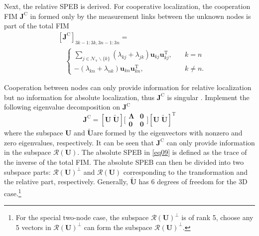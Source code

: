\documentclass{IEEEtran}
\begin{document}
Next, the relative SPEB is derived. For cooperative localization, the cooperation FIM $\mathbf{J}^{\text{C}}$ in \cite{SheWymWin:J10} formed only by the measurement links between the unknown nodes is part of the total FIM
\begin{equation}
\begin{aligned}
&[\mathbf{J}^{\text{C}}]_{3k-1:3k,3n-1:3n}=\\
&\quad \begin{cases}
\sum_{j\in\mathcal{N}_{\text{v}}\backslash \{k\}}(\lambda_{kj}+\lambda_{jk})\mathbf{u}_{kj}\mathbf{u}_{kj}^{\text{T}},\quad&k=n\\
-(\lambda_{kn}+\lambda_{nk})\mathbf{u}_{kn}\mathbf{u}_{kn}^{\text{T}},\quad&k\neq n.
\end{cases}
\end{aligned}
\end{equation}

Cooperation between nodes can only provide information for relative localization but no information for absolute localization, thus $\mathbf{J}^{\text{C}}$ is singular \cite{AshMos:J08}. Implement the following eigenvalue decomposition on $\mathbf{J}^{\text{C}}$
\begin{equation}
\mathbf{J}^{\text{C}}=[\mathbf{U} \; \widetilde{\mathbf{U}}]
\Bigg[\begin{array}{cc}
\boldsymbol{\Lambda}&\mathbf{0}\\
\mathbf{0}&\mathbf{0}
\end{array}\Bigg]
[\mathbf{U}\; \widetilde{\mathbf{U}}]^{\text{T}}
\end{equation}
where the subspace $\mathbf{U}$ and $\widetilde{\mathbf{U}}$are formed by the eigenvectors with nonzero and zero eigenvalues, respectively. It can be seen that $\mathbf{J}^{\text{C}}$ can only provide information in the subspace $\mathcal{R}(\mathbf{U})$. The absolute SPEB in \eqref{eq09} is defined as the trace of the inverse of the total FIM.  The absolute SPEB can then be divided into two subspace parts:  $\mathcal{R}(\mathbf{U})^\perp$ and $\mathcal{R}(\mathbf{U})$ corresponding to the transformation and the relative part, respectively.
Generally, $\widetilde{\mathbf{U}}$  has 6 degrees of freedom for the 3D case.\footnote{For the special two-node case, the subspace $\mathcal{R}(\mathbf{U})^\perp$ is of rank 5, choose any 5 vectors in $\mathcal{R}(\mathbf{U})^\perp$ can form the subspace $\mathcal{R}(\mathbf{U})^\perp$. }
\end{document}
